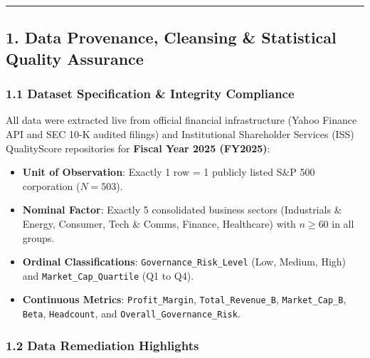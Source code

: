 \documentclass[
]{article}
\providecommand{\tightlist}{%
  \setlength{\itemsep}{0pt}\setlength{\parskip}{0pt}}
\begin{document}
\begin{center}\rule{0.5\linewidth}{0.5pt}\end{center}

\subsection{1. Data Provenance, Cleansing \& Statistical Quality
Assurance}\label{data-provenance-cleansing-statistical-quality-assurance}

\subsubsection{1.1 Dataset Specification \& Integrity
Compliance}\label{dataset-specification-integrity-compliance}

All data were extracted live from official financial infrastructure
(Yahoo Finance API and SEC 10-K audited filings) and Institutional
Shareholder Services (ISS) QualityScore repositories for \textbf{Fiscal
Year 2025 (FY2025)}:

\begin{itemize}
\tightlist
\item
  \textbf{Unit of Observation}: Exactly 1 row = 1 publicly listed S\&P
  500 corporation (\(N = 503\)).
\item
  \textbf{Nominal Factor}: Exactly 5 consolidated business sectors
  (Industrials \& Energy, Consumer, Tech \& Comms, Finance, Healthcare)
  with \(n \ge 60\) in all groups.
\item
  \textbf{Ordinal Classifications}: \texttt{Governance\_Risk\_Level}
  (Low, Medium, High) and \texttt{Market\_Cap\_Quartile} (Q1 to Q4).
\item
  \textbf{Continuous Metrics}: \texttt{Profit\_Margin},
  \texttt{Total\_Revenue\_B}, \texttt{Market\_Cap\_B}, \texttt{Beta},
  \texttt{Headcount}, and \texttt{Overall\_Governance\_Risk}.
\end{itemize}

\subsubsection{1.2 Data Remediation
Highlights}\label{data-remediation-highlights}
\end{document}
